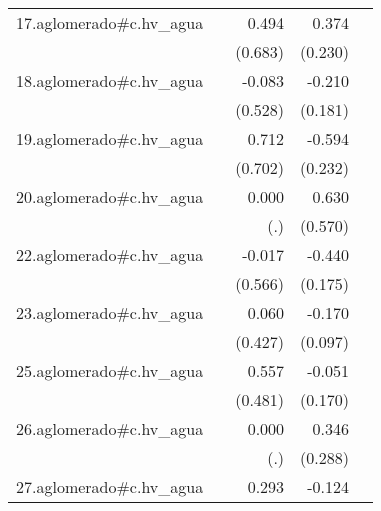 {\begin{longtable}{l*{4}{D{.}{.}{-1}}}
\addlinespace
17.aglomerado#c.hv\_agua&                     &       0.494         &       0.374         &                     \\
            &                     &     (0.683)         &     (0.230)         &                     \\
\addlinespace
18.aglomerado#c.hv\_agua&                     &      -0.083         &      -0.210         &                     \\
            &                     &     (0.528)         &     (0.181)         &                     \\
\addlinespace
19.aglomerado#c.hv\_agua&                     &       0.712         &      -0.594\sym{*}  &                     \\
            &                     &     (0.702)         &     (0.232)         &                     \\
\addlinespace
20.aglomerado#c.hv\_agua&                     &       0.000         &       0.630         &                     \\
            &                     &         (.)         &     (0.570)         &                     \\
\addlinespace
22.aglomerado#c.hv\_agua&                     &      -0.017         &      -0.440\sym{*}  &                     \\
            &                     &     (0.566)         &     (0.175)         &                     \\
\addlinespace
23.aglomerado#c.hv\_agua&                     &       0.060         &      -0.170         &                     \\
            &                     &     (0.427)         &     (0.097)         &                     \\
\addlinespace
25.aglomerado#c.hv\_agua&                     &       0.557         &      -0.051         &                     \\
            &                     &     (0.481)         &     (0.170)         &                     \\
\addlinespace
26.aglomerado#c.hv\_agua&                     &       0.000         &       0.346         &                     \\
            &                     &         (.)         &     (0.288)         &                     \\
\addlinespace
27.aglomerado#c.hv\_agua&                     &       0.293         &      -0.124         &                     \\

\end{longtable}}
